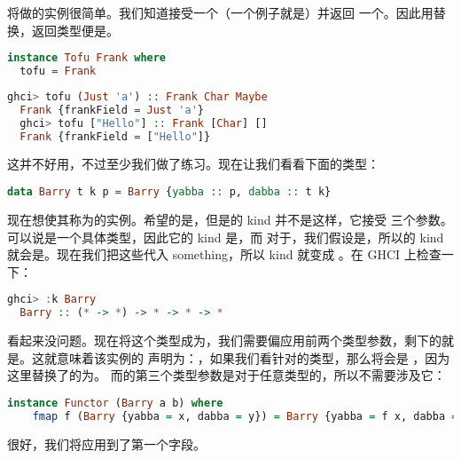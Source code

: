 \documentclass[./main.tex]{subfiles}
\begin{document}
将做的实例很简单。我们知道接受一个（一个例子就是）并返回
一个。因此用替换，返回类型便是。

\begin{lstlisting}[language=Haskell]
  instance Tofu Frank where
  tofu = Frank
\end{lstlisting}

\begin{lstlisting}[language=Haskell]
  ghci> tofu (Just 'a') :: Frank Char Maybe
  Frank {frankField = Just 'a'}
  ghci> tofu ["Hello"] :: Frank [Char] []
  Frank {frankField = ["Hello"]}
\end{lstlisting}

这并不好用，不过至少我们做了练习。现在让我们看看下面的类型：

\begin{lstlisting}[language=Haskell]
  data Barry t k p = Barry {yabba :: p, dabba :: t k}
\end{lstlisting}

现在想使其称为的实例。希望的是\acode{* -> *}，但是的 kind 并不是这样，它接受
三个参数。可以说是一个具体类型，因此它的 kind 是\acode{*}，而
对于，我们假设是\acode{*}，所以的 kind 就会是\acode{* -> *}。现在我们把这些代入 something，所以 kind
就变成 \acode{(* -> *) -> * -> * -> *}。在 GHCI 上检查一下：

\begin{lstlisting}[language=Haskell]
  ghci> :k Barry
  Barry :: (* -> *) -> * -> * -> *
\end{lstlisting}

看起来没问题。现在将这个类型成为，我们需要偏应用前两个类型参数，剩下的就是\acode{* -> *}。这就意味着该实例的
声明为：，如果我们看针对的类型，那么将会是
，因为这里替换了的为。
而的第三个类型参数是对于任意类型的，所以不需要涉及它：

\begin{lstlisting}[language=Haskell]
  instance Functor (Barry a b) where
    fmap f (Barry {yabba = x, dabba = y}) = Barry {yabba = f x, dabba = y}
\end{lstlisting}

很好，我们将应用到了第一个字段。
\end{document}
